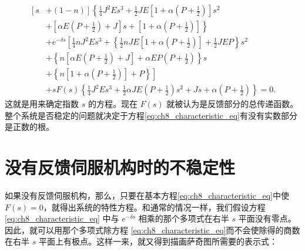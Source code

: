 \begin{equation}\label{eq:ch8_characteristic_eq}
\begin{array}{ll}
\left[ s\right. &\left. + (1 - n) \right] \left\{ \frac{1}{4} J^2 E s^3 + \frac{1}{2} J E \left[ 1 + \alpha \left( P + \frac{1}{2} \right) \right] s^2 \right. \\
&+ \left. \left[ \alpha E \left( P + \frac{1}{2} \right) + J \right] s + \left[ 1 + \alpha \left( P + \frac{1}{2} \right) \right] \right\} \\
&+ e^{-\delta s} \left[ \frac{1}{4} n J^2 E s^3 + \left\{ \frac{1}{2} n J E \left[ 1 + \alpha \left( P + \frac{1}{2} \right) \right] + \frac{1}{2} J E P \right\} s^2 \right. \\
&+ \left. \left\{ n \left[ \alpha E \left( P + \frac{1}{2} \right) + J \right] + \alpha E P \left( P + \frac{1}{2} \right) \right\} s \right. \\
&+ \left. \left\{ n \left[ 1 + \alpha \left( P + \frac{1}{2} \right) \right] + P \right\} \right] \\
&+ s F(s) \left\{ \frac{1}{4} J^2 E s^3 + \frac{1}{2} \alpha J E \left( P + \frac{1}{2} \right) s^2 + J s + \alpha \left( P + \frac{1}{2} \right) \right\} = 0.
\end{array}
\end{equation}
这就是用来确定指数 $ s $ 的方程。现在 $ F(s) $ 就被认为是反馈部分的总传递函数。整个系统是否稳定的问题就决定于方程\eqref{eq:ch8_characteristic_eq}有没有实数部分是正数的根。

\section{没有反馈伺服机构时的不稳定性}

如果没有反馈伺服机构，那么，只要在基本方程\eqref{eq:ch8_characteristic_eq}中使 $ F(s) = 0 $，就得出系统的特性方程。和通常的情况一样，我们假设方程 \eqref{eq:ch8_characteristic_eq} 中与 $ e^{-\delta s} $ 相乘的那个多项式在右半 $ s $ 平面没有零点。因此，就可以用那个多项式除方程 \eqref{eq:ch8_characteristic_eq}而不会使除得的商数在右半 $ s $ 平面上有极点。这样一来，就又得到描画萨奇图所需要的表示式：

